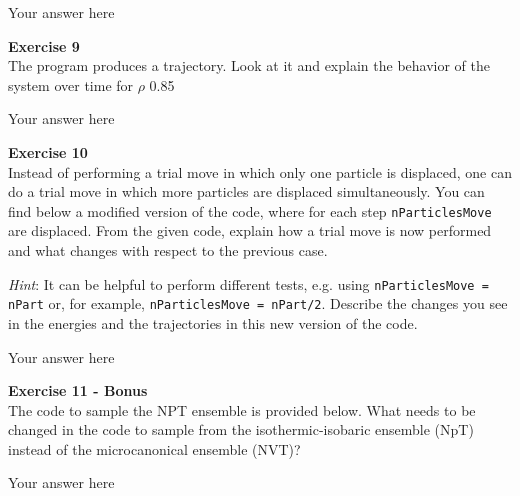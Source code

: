 \documentclass{article}
\begin{document}
Your answer here

\begin{mdframed}
\textbf{Exercise 9}\\
The program produces a trajectory. Look at it and explain the behavior of the system over time for $\rho$ 0.85
\end{mdframed}

Your answer here

\begin{mdframed}
\textbf{Exercise 10}\\
Instead of performing a trial move in which only one particle is displaced, one can do a trial move in which more particles are
displaced simultaneously. You can find below a modified version of the code, where for each step \texttt{nParticlesMove} are displaced.
From the given code, explain how a trial move is now performed and what changes with respect to the previous case.

\textit{Hint}: It can be helpful to perform different tests, e.g. using \texttt{nParticlesMove = nPart} or, for example, \texttt{nParticlesMove = nPart/2}. Describe the changes you see in the energies and the trajectories in this new version of the code.
\end{mdframed}

Your answer here

\begin{mdframed}
\textbf{Exercise 11 - Bonus}\\
The code to sample the NPT ensemble is provided below. What needs to be changed in the code to sample from the isothermic-isobaric ensemble (NpT) instead of the microcanonical ensemble (NVT)?
\end{mdframed}

Your answer here

\end{document}
